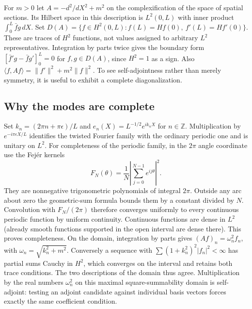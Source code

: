 For $m>0$ let $A=-d^2/dX^2+m^2$ on the complexification of the space of spatial sections. Its Hilbert space in this description is $L^2(0,L)$ with inner product $\int_0^L\bar f g\,dX$. Set $D(A)=\{f\in H^2(0,L): f(L)=H f(0),\ f'(L)=H f'(0)\}$. These are traces of $H^2$ functions, not values assigned to arbitrary $L^2$ representatives. Integration by parts twice gives the boundary form $[\bar f'g-\bar f g']_0^L=0$ for $f,g\in D(A)$, since $H^2=1$ as a sign. Also $\langle f,Af\rangle=\|f'\|^2+m^2\|f\|^2$. To see self-adjointness rather than merely symmetry, it is useful to exhibit a complete diagonalization.

\subsection{Why the modes are complete}\label{f:circle-fourier}
Set $k_n=(2\pi n+\pi\epsilon)/L$ and $e_n(X)=L^{-1/2}e^{ik_n X}$ for $n\in\mathbb Z$. Multiplication by $e^{-i\pi\epsilon X/L}$ identifies the twisted Fourier family with the ordinary periodic one and is unitary on $L^2$. For completeness of the periodic family, in the $2\pi$ angle coordinate use the Fej\'er kernels
\[
 F_N(\theta)=\frac1N\left|\sum_{j=0}^{N-1}e^{ij\theta}\right|^2 .
\]
They are nonnegative trigonometric polynomials of integral $2\pi$. Outside any arc about zero the geometric-sum formula bounds them by a constant divided by $N$. Convolution with $F_N/(2\pi)$ therefore converges uniformly to every continuous periodic function by uniform continuity. Continuous functions are dense in $L^2$ (already smooth functions supported in the open interval are dense there). This proves completeness. On the domain, integration by parts gives $(Af)_n=\omega_n^2f_n$, with $\omega_n=\sqrt{k_n^2+m^2}$. Conversely a sequence with $\sum(1+k_n^2)^2|f_n|^2<\infty$ has partial sums Cauchy in $H^2$, which converges on the interval and retains both trace conditions. The two descriptions of the domain thus agree. Multiplication by the real numbers $\omega_n^2$ on this maximal square-summability domain is self-adjoint: testing an adjoint candidate against individual basis vectors forces exactly the same coefficient condition.

